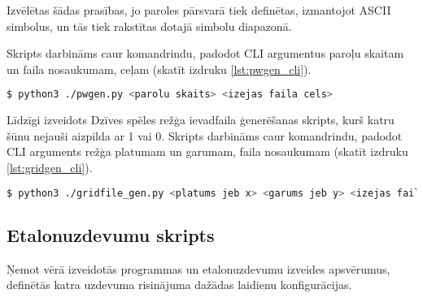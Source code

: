 Izvēlētas šādas prasības, jo paroles pārsvarā tiek definētas, izmantojot ASCII
simbolus, un tās  tiek rakstītas dotajā simbolu diapazonā.
\cite{pw_user_practice}

Skripts darbināms caur komandrindu, padodot CLI argumentus paroļu skaitam
un faila nosaukumam, ceļam (skatīt izdruku \ref{lst:pwgen_cli}).
\begin{lstlisting}[caption={Paroļu faila ģenerēšanas skripta darbināšana},
    captionpos=b,
    label=lst:pwgen_cli, language=bash]
$ python3 ./pwgen.py <parolu skaits> <izejas faila cels>
\end{lstlisting}

Līdzīgi izveidots Dzīves spēles režģa ievadfaila ģenerēšanas skripts, kurš
katru šūnu nejauši aizpilda ar 1 vai 0. Skripts darbināms caur komandrindu,
padodot CLI arguments režģa platumam un garumam, faila nosaukumam (skatīt
izdruku \ref{lst:gridgen_cli}).

\begin{lstlisting}[caption={Režģa failaģenerēšanas skripta darbināšana},
    captionpos=b,
    label=lst:gridgen_cli, language=bash]
$ python3 ./gridfile_gen.py <platums jeb x> <garums jeb y> <izejas faila cels>
\end{lstlisting}

\subsection{Etalonuzdevumu skripts}
Ņemot vērā izveidotās programmas un etalonuzdevumu izveides apsvērumus,
definētās katra uzdevuma risinājuma dažādas laidienu konfigurācijas.

